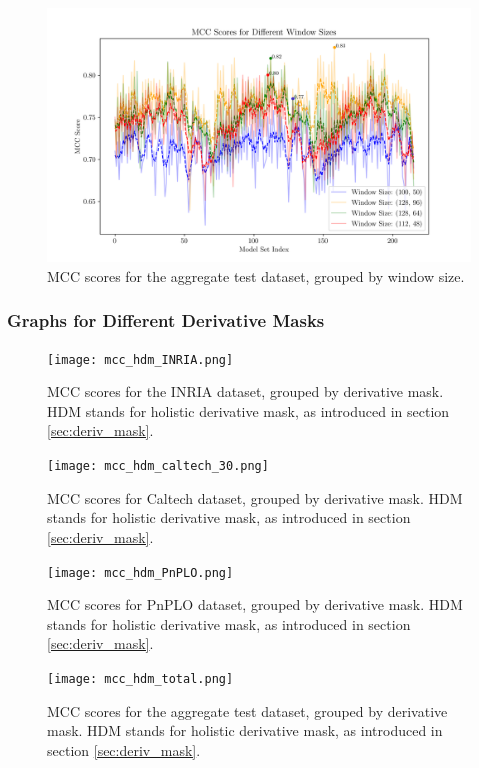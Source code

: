 \begin{figure}
    \centering
    \includegraphics[width=0.9\linewidth]{../images/mcc_windows_total.png}
    \caption{
        MCC scores for the aggregate test dataset, grouped by window size.
    }
\end{figure}

\subsubsection{Graphs for Different Derivative Masks}


\begin{figure}
    \centering
    \texttt{[image: mcc\_hdm\_INRIA.png]}
    \caption{
        MCC scores for the INRIA dataset, grouped by derivative mask. HDM stands for holistic derivative mask, as introduced in section \ref{sec:deriv_mask}.
    }
    \label{fig:hdm_inria}
\end{figure}
\begin{figure}
    \centering
    \texttt{[image: mcc\_hdm\_caltech\_30.png]}
    \caption{
        MCC scores for Caltech dataset, grouped by derivative mask. HDM stands for holistic derivative mask, as introduced in section \ref{sec:deriv_mask}.
    }
    \label{fig:hdm_caltech}
\end{figure}
\begin{figure}
    \centering
    \texttt{[image: mcc\_hdm\_PnPLO.png]}
    \caption{
        MCC scores for PnPLO dataset, grouped by derivative mask. HDM stands for holistic derivative mask, as introduced in section \ref{sec:deriv_mask}.
    }
    \label{fig:hdm_pnplo}
\end{figure}

\begin{figure}
    \centering
    \texttt{[image: mcc\_hdm\_total.png]}
    \caption{
        MCC scores for the aggregate test dataset, grouped by derivative mask. HDM stands for holistic derivative mask, as introduced in section \ref{sec:deriv_mask}.
    }
    \label{fig:hdm_total}
\end{figure}


